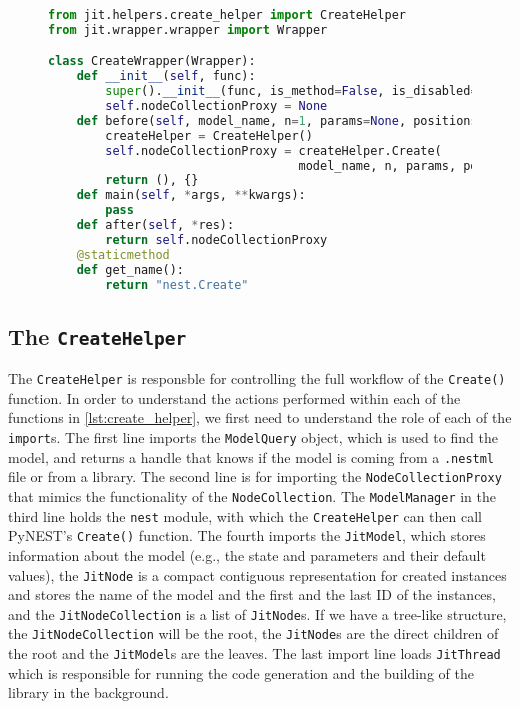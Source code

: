 \begin{figure}[ht!]
    \centering
    \begin{lstlisting}[language=Python, label=lst:create_wrapper, caption={The \texttt{CreateWrapper}}]
from jit.helpers.create_helper import CreateHelper
from jit.wrapper.wrapper import Wrapper

class CreateWrapper(Wrapper):
    def __init__(self, func):
        super().__init__(func, is_method=False, is_disabled=False)
        self.nodeCollectionProxy = None
    def before(self, model_name, n=1, params=None, positions=None):
        createHelper = CreateHelper()
        self.nodeCollectionProxy = createHelper.Create(
                                   model_name, n, params, positions)
        return (), {}
    def main(self, *args, **kwargs):
        pass
    def after(self, *res):
        return self.nodeCollectionProxy
    @staticmethod
    def get_name():
        return "nest.Create"
\end{lstlisting}
\end{figure}

\subsection{The \texttt{CreateHelper}}

The \texttt{CreateHelper} is responsble for controlling the full workflow of the \texttt{Create()} function. In order to understand the actions performed within each of the functions in \autoref{lst:create_helper}, we first need to understand the role of each of the \texttt{import}s. The first line imports the \texttt{ModelQuery} object, which is used to find the model, and returns a handle that knows if the model is coming from a \texttt{.nestml} file or from a library. The second line is for importing the \texttt{NodeCollectionProxy} that mimics the functionality of the \texttt{NodeCollection}. The \texttt{ModelManager} in the third line holds the \texttt{nest} module, with which the \texttt{CreateHelper} can then call PyNEST's \texttt{Create()} function. The fourth imports the \texttt{JitModel}, which stores information about the model (e.g., the state and parameters and their default values), the \texttt{JitNode} is a compact contiguous representation for created instances and stores the name of the model and the first and the last ID of the instances, and the \texttt{JitNodeCollection} is a list of \texttt{JitNode}s. If we have a tree-like structure, the \texttt{JitNodeCollection} will be the root, the \texttt{JitNode}s are the direct children of the root and the \texttt{JitModel}s are the leaves. The last import line loads \texttt{JitThread} which is responsible for running the code generation and the building of the library in the background.

